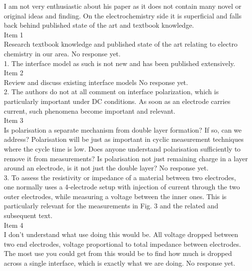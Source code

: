 \documentclass[journal, a4paper]{IEEEtran}
\begin{document}
{\color{blue}
I am not very enthusiastic about his paper as it does not contain many novel or original ideas and finding. On the electrochemistry side it is superficial and falls back behind published state of the art and textbook knowledge.\\
{\color{OliveGreen}
    Item 1\\
    {\color{Red} Research textbook knowledge and published state of the art relating to electro chemistry in our area.}
    No response yet.
}\\

1. The interface model as such is not new and has been published extensively.\\
{\color{OliveGreen}
    Item 2\\
    {\color{Red} Review and discuss existing interface models}
    No response yet.
}\\

2. The authors do not at all comment on interface polarization, which is particularly important under DC conditions. As soon as an electrode carries current, such phenomena become important and relevant.\\
{\color{OliveGreen}
    Item 3\\
    {\color{Red} Is polarisation a separate mechanism from double layer formation? If so, can we address? Polarisation will be just as important in cyclic measurement techniques where the cycle time is low. Does anyone understand polarisation sufficiently to remove it from measurements? Is polarisation not just remaining charge in a layer around an electrode, is it not just the double layer?}
    No response yet.
}\\

3. To assess the resistivity or impedance of a material between two electrodes, one normally uses a 4-electrode setup with injection of current through the two outer electrodes, while measuring a voltage between the inner ones. This is particularly relevant for the measurements in Fig. 3 and the related and subsequent text.\\
{\color{OliveGreen} 
    Item 4\\
    {\color{Red} I don't understand what use doing this would be. All voltage dropped between two end electrodes, voltage proportional to total impedance between electrodes. The most use you could get from this would be to find how much is dropped across a single interface, which is exactly what we are doing.}
    No response yet.    
}\\

}
\end{document}
